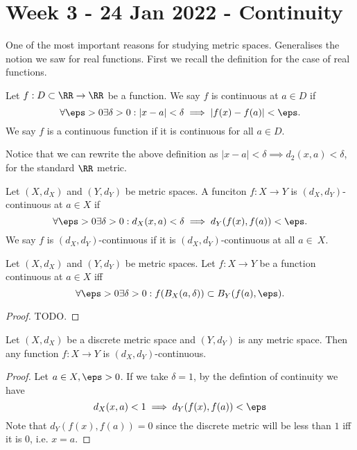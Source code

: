 \section{Week 3 - 24 Jan 2022 - Continuity}
One of the most important reasons for studying metric spaces. Generalises the
notion we saw for real functions. First we recall the definition for the case of
real functions.

\begin{definition}
  Let $f:D\subset\RR\to\RR$ be a function. We say $f$ is continuous at $a\in D$ if 
  \[\forall\eps>0\exists\delta>0 : |x-a|<\delta\implies |f(x)-f(a)|<\eps.\]
  We say $f$ is a continuous function if it is continuous for all $a\in D$.
  
  Notice that we can rewrite the above definition as $|x-a|<\delta \implies
  d_2(x,a)<\delta$, for the standard $\RR$ metric.
  \label{def:realContinuous}
\end{definition}

\begin{definition}
  Let $(X,d_X)$ and $(Y,d_Y)$ be metric spaces. A funciton $f:X\to Y$ is
  $(d_X,d_Y)$-continuous at $a\in X$ if 
  \[\forall \eps>0 \exists \delta>0 : d_X(x,a)<\delta \implies
  d_Y(f(x),f(a))<\eps.\]
  We say $f$ is $(d_X,d_Y)$-continuous if it is $(d_X,d_Y)$-continuous at all
  $a\in\ X$.
  \label{def:metricContinuous}
\end{definition}

\begin{proposition}
  Let $(X,d_X)$ and $(Y,d_Y)$ be metric spaces. Let $f:X\to Y$ be a function
  continuous at $a\in X$ iff 
  \[\forall \eps>0\exists \delta>0 : f(B_X(a,\delta))\subset B_Y(f(a),\eps).\]
  \label{<+label+>}
\end{proposition}
\begin{proof}
  TODO.
\end{proof}

\begin{proposition}
  Let $(X,d_X)$ be a discrete metric space and $(Y,d_Y)$ is any metric space.
  Then any function $f:X\to Y$ is $(d_X,d_Y)$-continuous.
  \label{prop:discreteFuncsContinuous}
\end{proposition}
\begin{proof}
  Let $a\in X, \eps>0$. If we take $\delta=1$, by the defintion of continuity we
  have 
  \[d_X(x,a)<1 \implies d_Y(f(x),f(a))<\eps\]
  Note that $d_Y(f(x),f(a))=0$ since the discrete metric will be less than $1$
  iff it is $0$, i.e. $x=a$.
\end{proof}

